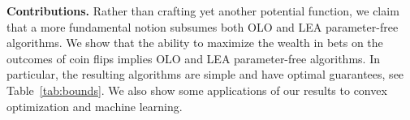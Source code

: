 \textbf{Contributions.} Rather than crafting yet another potential function, we claim that a more fundamental notion
subsumes both \ac{OLO} and \ac{LEA} parameter-free algorithms. We show that the ability to maximize the wealth in bets on the outcomes of coin flips implies \ac{OLO} and \ac{LEA} parameter-free algorithms.
In particular, the resulting algorithms are simple and have optimal guarantees, see Table~\ref{tab:bounds}. We also show some applications of our results to convex optimization and machine learning.

\begin{table}
\begin{center}
\end{center}
\end{table}
